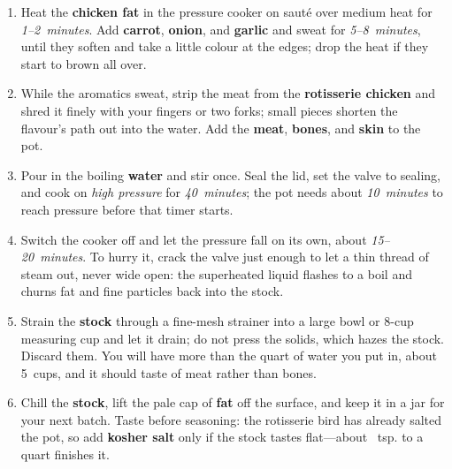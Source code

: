 \documentclass[11pt,letterpaper]{article}
\begin{document}
\begin{enumerate}
    \item Heat the \textbf{chicken fat} in the pressure cooker on sauté over medium heat for \textit{1--2~minutes}. Add \textbf{carrot}, \textbf{onion}, and \textbf{garlic} and sweat for \textit{5--8~minutes}, until they soften and take a little colour at the edges; drop the heat if they start to brown all over.

    \item While the aromatics sweat, strip the meat from the  \textbf{rotisserie chicken} and shred it finely with your fingers or two forks; small pieces shorten the flavour's path out into the water. Add the \textbf{meat}, \textbf{bones}, and \textbf{skin} to the pot.

    \item Pour in the boiling \textbf{water} and stir once. Seal the lid, set the valve to sealing, and cook on \textit{high pressure} for \textit{40~minutes}; the pot needs about \textit{10~minutes} to reach pressure before that timer starts.

    \item Switch the cooker off and let the pressure fall on its own, about \textit{15--20~minutes}. To hurry it, crack the valve just enough to let a thin thread of steam out, never wide open: the superheated liquid flashes to a boil and churns fat and fine particles back into the stock.

    \item Strain the \textbf{stock} through a fine-mesh strainer into a large bowl or 8-cup measuring cup and let it drain; do not press the solids, which hazes the stock. Discard them. You will have more than the quart of water you put in, about 5~cups, and it should taste of meat rather than bones.

    \item Chill the \textbf{stock}, lift the pale cap of \textbf{fat} off the surface, and keep it in a jar for your next batch. Taste before seasoning: the rotisserie bird has already salted the pot, so add \textbf{kosher salt} only if the stock tastes flat---about ~tsp. to a quart finishes it.
\end{enumerate}

\newpage
\end{document}
